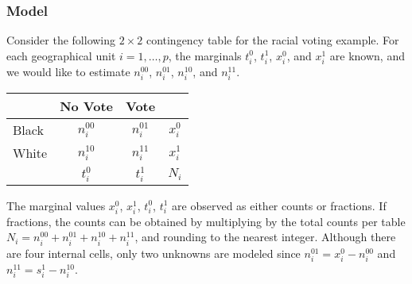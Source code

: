 \subsubsection{Model}
Consider the following $2 \times 2$ contingency table for the racial
voting example.  For each geographical unit $i = 1, \dots, p$, the
marginals $t_i^0$, $t_i^1$, $x_i^0$, and $x_i^1$ are known, and we
would like to estimate $n_i^{00}$, $n_i^{01}$, $n_i^{10}$, and $n_i^{11}$.
\begin{table}[h!]
  \begin{center}
    \begin{tabular}{l|cc|c}
      & No Vote  & Vote &         \\
      \hline
      Black & $n_i^{00}$  & $n_i^{01}$ & $x_i^0$   \\
      White & $n_i^{10}$  & $n_i^{11}$ & $x_i^1$ \\
      \hline
      & $t_i^0$ & $t_i^1$ & $N_i$         
    \end{tabular}
  \end{center}
\end{table}

\noindent The marginal values $x_{i}^0$, $x_{i}^1$, $t_i^0$, $t_i^1$ are
observed as either counts or fractions. If fractions, the counts can
be obtained by multiplying by the total counts per table $N_i =
n_i^{00} + n_i^{01} + n_i^{10} + n_i^{11}$, and rounding to the
nearest integer.  Although there are four internal cells, only two
unknowns are modeled since $n_i^{01} = x_i^0 - n_{i}^{00}$ and
$n_{i}^{11} = s_i^1 - n_{i}^{10}$. \\

